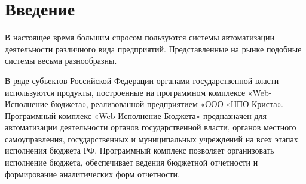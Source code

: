\documentclass[a4paper]{extarticle}
\begin{document}
{\small \setlength{\parskip}{0cm} \tableofcontents \par}

\newpage
\section*{Введение}
В настоящее время большим спросом пользуются системы автоматизации деятельности различного вида предприятий. Представленные на рынке подобные системы весьма разнообразны.\par
В ряде субъектов Российской Федерации органами государственной власти используются продукты, построенные на программном комплексе «Web-Исполнение бюджета», реализованной предприятием «ООО «НПО Криста». Программный комплекс «Web-Исполнение Бюджета» предназначен для автоматизации деятельности органов государственной власти, органов местного самоуправления, государственных и муниципальных учреждений на всех этапах исполнения бюджета РФ. Программный комплекс позволяет организовать исполнение бюджета, обеспечивает ведения бюджетной отчетности и формирование аналитических форм отчетности.\par
\end{document}
